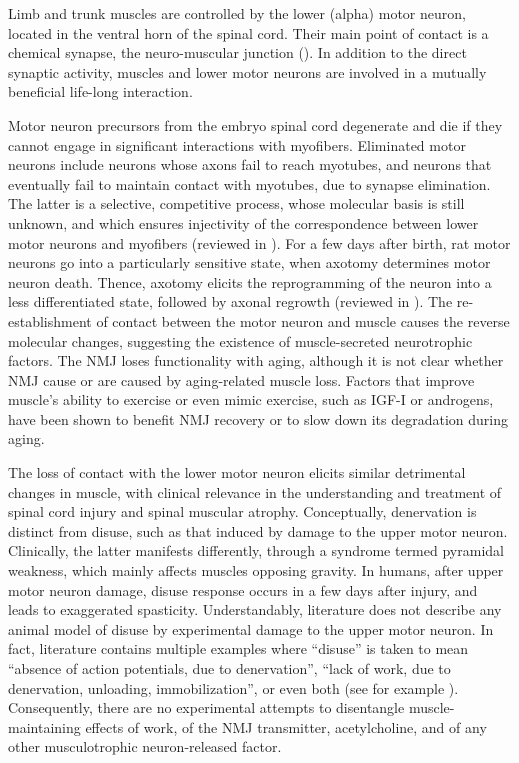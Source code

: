 \documentclass[12pt,english]{report}\usepackage[]{graphicx}\usepackage[]{color}
\begin{document}
Limb and trunk muscles are controlled by the lower (alpha) motor neuron,
located in the ventral horn of the spinal cord. Their main point of
contact is a chemical synapse, the neuro-muscular junction ().
In addition to the direct synaptic activity, muscles and lower motor
neurons are involved in a mutually beneficial life-long interaction. 

Motor neuron precursors from the embryo spinal cord degenerate and
die if they cannot engage in significant interactions with myofibers\citep{oconnor1974cell}.
Eliminated motor neurons include neurons whose axons fail to reach
myotubes, and neurons that eventually fail to maintain contact with
myotubes, due to synapse elimination. The latter is a selective, competitive
process, whose molecular basis is still unknown, and which ensures
injectivity of the correspondence between lower motor neurons and
myofibers (reviewed in \citep{favero2014hebb-based}). For a few days
after birth, rat motor neurons go into a particularly sensitive state,
when axotomy determines motor neuron death\citep{burls1991absence}.
Thence, axotomy elicits the reprogramming of the neuron into a less
differentiated state, followed by axonal regrowth (reviewed in \citep{kuno1990target,grinnell1995dynamics}).
The re-establishment of contact between the motor neuron and muscle
causes the reverse molecular changes, suggesting the existence of
muscle-secreted neurotrophic factors. The NMJ loses functionality
with aging, although it is not clear whether NMJ cause or are caused
by aging-related muscle loss\citep{gonzalez-freire2014neuromuscular}.
Factors that improve muscle's ability to exercise or even mimic exercise,
such as IGF-I or androgens, have been shown to benefit NMJ recovery
or to slow down its degradation during aging\citep{serra2013characterization,nishimune2014role,apel2010effect}.

The loss of contact with the lower motor neuron elicits similar detrimental
changes in muscle, with clinical relevance in the understanding and
treatment of spinal cord injury and spinal muscular atrophy. Conceptually,
denervation is distinct from disuse, such as that induced by damage
to the upper motor neuron. Clinically, the latter manifests differently,
through a syndrome termed pyramidal weakness, which mainly affects
muscles opposing gravity\citep{thijs1998distribution}. In humans,
after upper motor neuron damage, disuse response occurs in a few days
after injury, and leads to exaggerated spasticity\citep{purves2001damage}.
Understandably, literature does not describe any animal model of disuse
by experimental damage to the upper motor neuron. In fact, literature
contains multiple examples where ``disuse'' is taken to mean ``absence
of action potentials, due to denervation'', ``lack of work, due
to denervation, unloading, immobilization'', or even both (see for
example \citep{jackman2004molecular}). Consequently, there are no
experimental attempts to disentangle muscle-maintaining effects of
work, of the NMJ transmitter, acetylcholine, and of any other musculotrophic
neuron-released factor.
\end{document}
